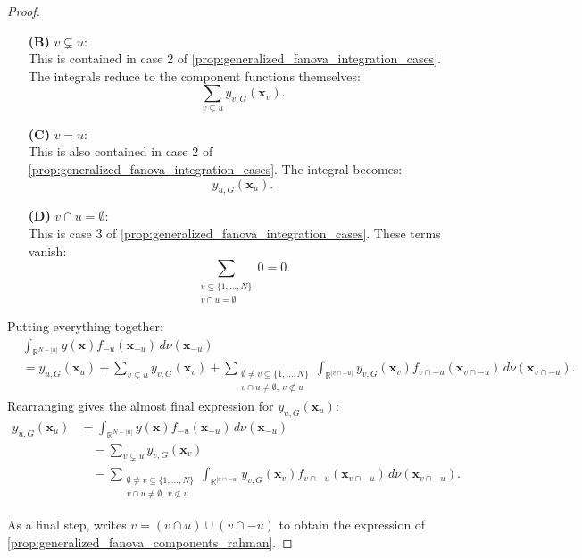 \begin{proof}
\begin{itemize}
  \item[\textbf{(B)}] \( v \subsetneq u \): \\
  This is contained in case 2 of \autoref{prop:generalized_fanova_integration_cases}. The integrals reduce to the component functions themselves:
  \[
  \sum_{v \subsetneq u} y_{v,G}(\boldsymbol{x}_v).
  \]

  \item[\textbf{(C)}] \( v = u \): \\
  This is also contained in case 2 of \autoref{prop:generalized_fanova_integration_cases}. The integral becomes:
  \[
  y_{u,G}(\boldsymbol{x}_u).
  \]

  \item[\textbf{(D)}] \( v \cap u = \emptyset \): \\
  This is case 3 of \autoref{prop:generalized_fanova_integration_cases}. These terms vanish:
  \[
  \sum_{\substack{v \subseteq \{1,\dots,N\} \\ v \cap u = \emptyset}} 0 = 0.
  \]
\end{itemize}
Putting everything together:
\[
\begin{aligned}
&\int_{\mathbb{R}^{N - |u|}} y(\boldsymbol{x}) f_{-u}(\boldsymbol{x}_{-u}) 
    \, d \nu(\boldsymbol{x}_{-u}) \\
&= y_{u,G}(\boldsymbol{x}_u)
   + \sum_{v \subsetneq u} y_{v,G}(\boldsymbol{x}_v) + 
   \sum_{\substack{\emptyset \ne v \subseteq \{1,\dots,N\} \\
                   v \cap u \ne \emptyset,\ v \not\subset u}} 
   \int_{\mathbb{R}^{|v \cap -u|}} 
        y_{v,G}(\boldsymbol{x}_v) 
        f_{v \cap -u}(\boldsymbol{x}_{v \cap -u}) 
        \, d \nu(\boldsymbol{x}_{v \cap -u}).
\end{aligned}
\]
Rearranging gives the almost final expression for \( y_{u,G}(\boldsymbol{x}_u) \):
\[
\begin{aligned}
y_{u,G}(\boldsymbol{x}_u)
&= 
\int_{\mathbb{R}^{N - |u|}} 
    y(\boldsymbol{x}) 
    f_{-u}(\boldsymbol{x}_{-u}) 
    \, d \nu(\boldsymbol{x}_{-u})
\\[0.5em]
&\quad
- \sum_{v \subsetneq u} 
    y_{v,G}(\boldsymbol{x}_v)
\\[0.5em]
&\quad
- \sum_{\substack{\emptyset \ne v \subseteq \{1,\dots,N\}\\
                    v \cap u \ne \emptyset,\ v \not\subset u}}
    \int_{\mathbb{R}^{|v \cap -u|}} 
        y_{v,G}(\boldsymbol{x}_v) 
        f_{v \cap -u}(\boldsymbol{x}_{v \cap -u}) 
        \, d \nu(\boldsymbol{x}_{v \cap -u}).
\end{aligned}
\]


As a final step, \citet{rahman2014} writes \( v = (v \cap u) \cup (v \cap -u) \) to obtain the expression of \autoref{prop:generalized_fanova_components_rahman}.
\end{proof}


